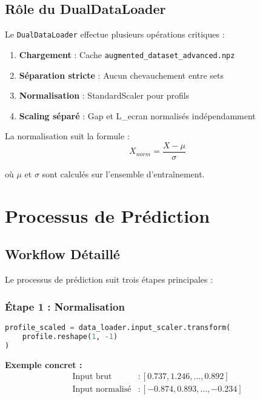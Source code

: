 \documentclass[10pt,twocolumn]{article}
\begin{document}
\subsection{Rôle du DualDataLoader}

Le \texttt{DualDataLoader} effectue plusieurs opérations critiques :

\begin{enumerate}
    \item \textbf{Chargement} : Cache \texttt{augmented\_dataset\_advanced.npz}
    \item \textbf{Séparation stricte} : Aucun chevauchement entre sets
    \item \textbf{Normalisation} : StandardScaler pour profils
    \item \textbf{Scaling séparé} : Gap et L\_ecran normalisés indépendamment
\end{enumerate}

La normalisation suit la formule :
\begin{equation}
X_{norm} = \frac{X - \mu}{\sigma}
\end{equation}

où $\mu$ et $\sigma$ sont calculés sur l'ensemble d'entraînement.

\section{Processus de Prédiction}

\subsection{Workflow Détaillé}

Le processus de prédiction suit trois étapes principales :

\subsubsection{Étape 1 : Normalisation}

\begin{lstlisting}[language=Python, caption=Normalisation de l'entrée]
profile_scaled = data_loader.input_scaler.transform(
    profile.reshape(1, -1)
)
\end{lstlisting}

\textbf{Exemple concret :}
\begin{align}
\text{Input brut} &: [0.737, 1.246, \ldots, 0.892] \\
\text{Input normalisé} &: [-0.874, 0.893, \ldots, -0.234]
\end{align}
\end{document}
